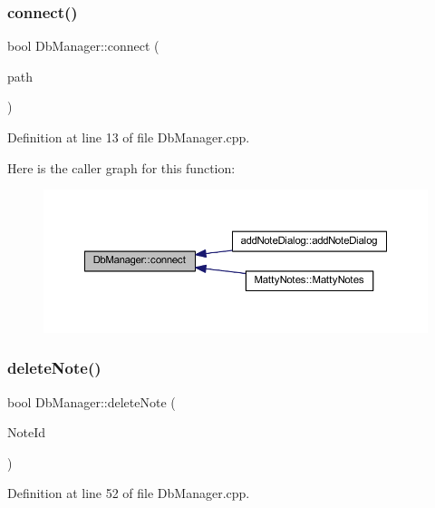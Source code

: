 \subsubsection{\texorpdfstring{connect()}{connect()}}
{\footnotesize\ttfamily bool Db\+Manager\+::connect (\begin{DoxyParamCaption}\item[{const Q\+String \&}]{path }\end{DoxyParamCaption})\hspace{0.3cm}{\ttfamily [static]}}



Definition at line 13 of file Db\+Manager.\+cpp.

Here is the caller graph for this function\+:
\nopagebreak
\begin{figure}[H]
\begin{center}
\leavevmode
\includegraphics[width=350pt]{classDbManager_abc90b3bf97dda268b4160a0662305898_icgraph}
\end{center}
\end{figure}
\hypertarget{classDbManager_a164849758fd05445c7af2cc04fc3569f}{}\label{classDbManager_a164849758fd05445c7af2cc04fc3569f} 
\subsubsection{\texorpdfstring{delete\+Note()}{deleteNote()}}
{\footnotesize\ttfamily bool Db\+Manager\+::delete\+Note (\begin{DoxyParamCaption}\item[{int}]{Note\+Id }\end{DoxyParamCaption})\hspace{0.3cm}{\ttfamily [static]}}



Definition at line 52 of file Db\+Manager.\+cpp.

